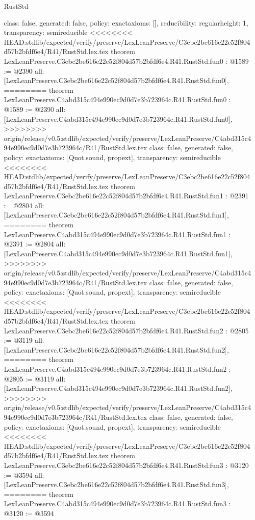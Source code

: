 \begin{lexlean}{RustStd}
\begin{coremodule}
{\begin{coremodule}
{{{  class: false,
  generated: false,
  policy: exact{axioms: []},
  reducibility: regular{height: 1},
  transparency: semireducible
}
<<<<<<<< HEAD:stdlib/expected/verify/preserve/LexLeanPreserve/C3ebc2be616e22c52f804d57b2bfdf6e4/R41/RustStd.lex.tex
theorem LexLeanPreserve.C3ebc2be616e22c52f804d57b2bfdf6e4.R41.RustStd.fun0 : @1589 := @2390 {
  all: [LexLeanPreserve.C3ebc2be616e22c52f804d57b2bfdf6e4.R41.RustStd.fun0],
========
theorem LexLeanPreserve.C4abd315c494e990ec9d0d7e3b723964c.R41.RustStd.fun0 : @1589 := @2390 {
  all: [LexLeanPreserve.C4abd315c494e990ec9d0d7e3b723964c.R41.RustStd.fun0],
>>>>>>>> origin/release/v0.5:stdlib/expected/verify/preserve/LexLeanPreserve/C4abd315c494e990ec9d0d7e3b723964c/R41/RustStd.lex.tex
  class: false,
  generated: false,
  policy: exact{axioms: [Quot.sound, propext]},
  transparency: semireducible
}
<<<<<<<< HEAD:stdlib/expected/verify/preserve/LexLeanPreserve/C3ebc2be616e22c52f804d57b2bfdf6e4/R41/RustStd.lex.tex
theorem LexLeanPreserve.C3ebc2be616e22c52f804d57b2bfdf6e4.R41.RustStd.fun1 : @2391 := @2804 {
  all: [LexLeanPreserve.C3ebc2be616e22c52f804d57b2bfdf6e4.R41.RustStd.fun1],
========
theorem LexLeanPreserve.C4abd315c494e990ec9d0d7e3b723964c.R41.RustStd.fun1 : @2391 := @2804 {
  all: [LexLeanPreserve.C4abd315c494e990ec9d0d7e3b723964c.R41.RustStd.fun1],
>>>>>>>> origin/release/v0.5:stdlib/expected/verify/preserve/LexLeanPreserve/C4abd315c494e990ec9d0d7e3b723964c/R41/RustStd.lex.tex
  class: false,
  generated: false,
  policy: exact{axioms: [Quot.sound, propext]},
  transparency: semireducible
}
<<<<<<<< HEAD:stdlib/expected/verify/preserve/LexLeanPreserve/C3ebc2be616e22c52f804d57b2bfdf6e4/R41/RustStd.lex.tex
theorem LexLeanPreserve.C3ebc2be616e22c52f804d57b2bfdf6e4.R41.RustStd.fun2 : @2805 := @3119 {
  all: [LexLeanPreserve.C3ebc2be616e22c52f804d57b2bfdf6e4.R41.RustStd.fun2],
========
theorem LexLeanPreserve.C4abd315c494e990ec9d0d7e3b723964c.R41.RustStd.fun2 : @2805 := @3119 {
  all: [LexLeanPreserve.C4abd315c494e990ec9d0d7e3b723964c.R41.RustStd.fun2],
>>>>>>>> origin/release/v0.5:stdlib/expected/verify/preserve/LexLeanPreserve/C4abd315c494e990ec9d0d7e3b723964c/R41/RustStd.lex.tex
  class: false,
  generated: false,
  policy: exact{axioms: [Quot.sound, propext]},
  transparency: semireducible
}
<<<<<<<< HEAD:stdlib/expected/verify/preserve/LexLeanPreserve/C3ebc2be616e22c52f804d57b2bfdf6e4/R41/RustStd.lex.tex
theorem LexLeanPreserve.C3ebc2be616e22c52f804d57b2bfdf6e4.R41.RustStd.fun3 : @3120 := @3594 {
  all: [LexLeanPreserve.C3ebc2be616e22c52f804d57b2bfdf6e4.R41.RustStd.fun3],
========
theorem LexLeanPreserve.C4abd315c494e990ec9d0d7e3b723964c.R41.RustStd.fun3 : @3120 := @3594 {
}}}}}}}
\end{coremodule}}
\end{coremodule}
\end{lexlean}
